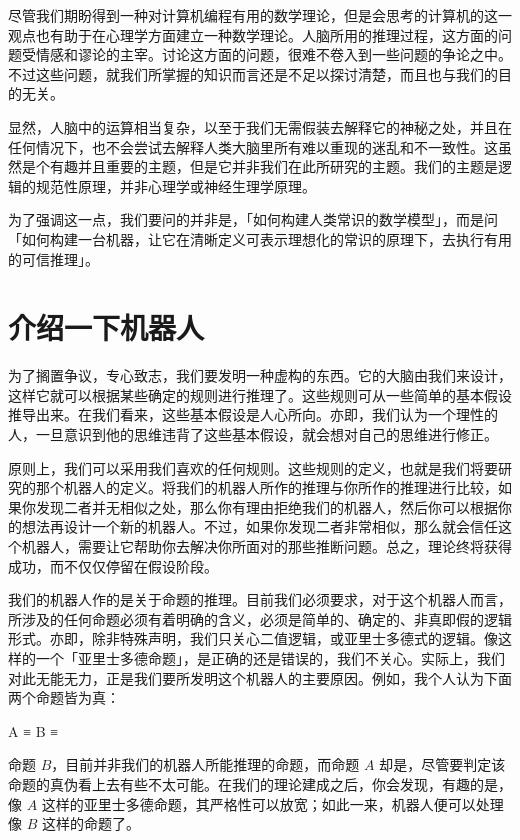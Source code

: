 尽管我们期盼得到一种对计算机编程有用的数学理论，但是会思考的计算机的这一观点也有助于在心理学方面建立一种数学理论。人脑所用的推理过程，这方面的问题受情感和谬论的主宰。讨论这方面的问题，很难不卷入到一些问题的争论之中。不过这些问题，就我们所掌握的知识而言还是不足以探讨清楚，而且也与我们的目的无关。

显然，人脑中的运算相当复杂，以至于我们无需假装去解释它的神秘之处，并且在任何情况下，也不会尝试去解释人类大脑里所有难以重现的迷乱和不一致性。这虽然是个有趣并且重要的主题，但是它并非我们在此所研究的主题。我们的主题是逻辑的规范性原理，并非心理学或神经生理学原理。

为了强调这一点，我们要问的并非是，「如何构建人类常识的数学模型」，而是问「如何构建一台机器，让它在清晰定义可表示理想化的常识的原理下，去执行有用的可信推理」。

\section{介绍一下机器人}

为了搁置争议，专心致志，我们要发明一种虚构的东西。它的大脑由我们来设计，这样它就可以根据某些确定的规则进行推理了。这些规则可从一些简单的基本假设推导出来。在我们看来，这些基本假设是人心所向。亦即，我们认为一个理性的人，一旦意识到他的思维违背了这些基本假设，就会想对自己的思维进行修正。

原则上，我们可以采用我们喜欢的任何规则。这些规则的定义，也就是我们将要研究的那个机器人的定义。将我们的机器人所作的推理与你所作的推理进行比较，如果你发现二者并无相似之处，那么你有理由拒绝我们的机器人，然后你可以根据你的想法再设计一个新的机器人。不过，如果你发现二者非常相似，那么就会信任这个机器人，需要让它帮助你去解决你所面对的那些推断问题。总之，理论终将获得成功，而不仅仅停留在假设阶段。

我们的机器人作的是关于命题的推理。目前我们必须要求，对于这个机器人而言，所涉及的任何命题必须有着明确的含义，必须是简单的、确定的、非真即假的逻辑形式。亦即，除非特殊声明，我们只关心二值逻辑，或亚里士多德式的逻辑。像这样的一个「亚里士多德命题」，是正确的还是错误的，我们不关心。实际上，我们对此无能无力，正是我们要所发明这个机器人的主要原因。例如，我个人认为下面两个命题皆为真：


\startformula
\startalign
\NC A \NC ≡ \NR
\NC B \NC ≡ \NR
\stopalign
\stopformula

命题 $B$，目前并非我们的机器人所能推理的命题，而命题 $A$ 却是，尽管要判定该命题的真伪看上去有些不太可能。在我们的理论建成之后，你会发现，有趣的是，像 $A$ 这样的亚里士多德命题，其严格性可以放宽；如此一来，机器人便可以处理像 $B$ 这样的命题了。

